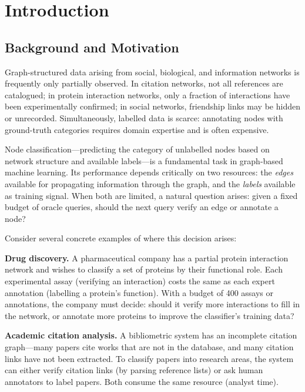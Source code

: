 \documentclass[12pt,a4paper,oneside]{report}
\begin{document}
\newpage
\tableofcontents
\newpage
\listoftables
\listoffigures

\chapter{Introduction}
\label{ch:intro}

\section{Background and Motivation}

Graph-structured data arising from social, biological, and information networks is frequently only partially observed. In citation networks, not all references are catalogued; in protein interaction networks, only a fraction of interactions have been experimentally confirmed; in social networks, friendship links may be hidden or unrecorded. Simultaneously, labelled data is scarce: annotating nodes with ground-truth categories requires domain expertise and is often expensive.

Node classification---predicting the category of unlabelled nodes based on network structure and available labels---is a fundamental task in graph-based machine learning. Its performance depends critically on two resources: the \emph{edges} available for propagating information through the graph, and the \emph{labels} available as training signal. When both are limited, a natural question arises: given a fixed budget of oracle queries, should the next query verify an edge or annotate a node?

Consider several concrete examples of where this decision arises:

\textbf{Drug discovery.} A pharmaceutical company has a partial protein interaction network and wishes to classify a set of proteins by their functional role. Each experimental assay (verifying an interaction) costs the same as each expert annotation (labelling a protein's function). With a budget of 400 assays or annotations, the company must decide: should it verify more interactions to fill in the network, or annotate more proteins to improve the classifier's training data?

\textbf{Academic citation analysis.} A bibliometric system has an incomplete citation graph---many papers cite works that are not in the database, and many citation links have not been extracted. To classify papers into research areas, the system can either verify citation links (by parsing reference lists) or ask human annotators to label papers. Both consume the same resource (analyst time).
\end{document}
